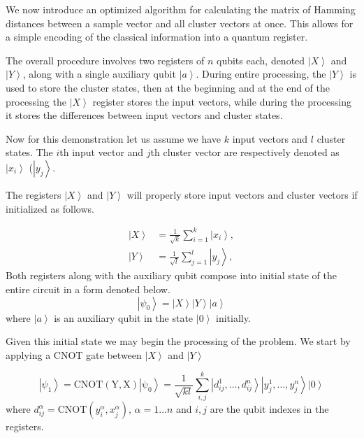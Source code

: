 \documentclass[pra,showkeys,twocolumn,showpacs]{revtex4-1}
\begin{document}
We now introduce an optimized algorithm for calculating the matrix of Hamming distances \cite{trugenberger2001} between a sample vector and all cluster vectors at once.  This allows for a simple encoding of the classical information into a quantum register.

The overall procedure involves two registers of $n$ qubits each, denoted $\left| X \right\rangle$ and $\left| Y \right\rangle$, along with a single auxiliary qubit $\left| a \right\rangle$. During entire processing, the $\left| Y \right\rangle$ is used to store the cluster states, then at the beginning and at the end of the processing the $\left| X \right\rangle$ register stores the input vectors, while during the processing it stores the differences between input vectors and cluster states.

Now for this demonstration let us assume we have $k$ input vectors and $l$ cluster states. The $i$th input vector and $j$th cluster vector are respectively denoted as $\left| x_i \right\rangle$ ($\left| y_j \right\rangle$.

The registers $\left| X \right\rangle$ and $\left| Y \right\rangle$ will properly store input vectors and cluster vectors if initialized as follows.

%
\begin{align}
    \left| X \right\rangle  & = \frac{1}{\sqrt{k}} \sum\limits_{i=1}^{k} \left| x_i \right\rangle,  \\
    \left| Y \right\rangle&  = \frac{1}{\sqrt{l}} \sum\limits_{j=1}^{l} \left| y_j \right\rangle,
    \label{eq:encodnig}
\end{align}
% 
Both registers along with the auxiliary qubit compose into initial state of the entire circuit in a form denoted below. 
%
\begin{equation} 
\left| \psi_0 \right\rangle = 
    \left| X \right\rangle
    \left| Y \right\rangle 
    \left| a \right\rangle
    \label{eq:initial_state}
\end{equation}
%
where $\left| a \right\rangle$ is an auxiliary qubit in the state $\left| 0 \right\rangle$ initially.

Given this initial state we may begin the processing of the problem. We start by applying a CNOT gate between $\left| X \right\rangle$ and $\left| Y \right\rangle$

\begin{equation}
    \left| \psi_1 \right\rangle = 
    \mathrm{CNOT(Y,X)\left| \psi_0 \right\rangle} =  
    \frac{1}{\sqrt{kl}} \sum\limits_{i, j}^{k} 
    \left| d^1_{ij}, \dots, d^n_{ij} \right\rangle 
    \left| y^1_j, \dots, y^n_j \right\rangle
    \left| 0 \right\rangle 
\end{equation}
where $d^\alpha_{ij} = \mathrm{CNOT}(y^\alpha_i, x^\alpha_j),\, \alpha = 1 \dots n$ and $i,j$ are the qubit indexes in the registers.
\end{document}

